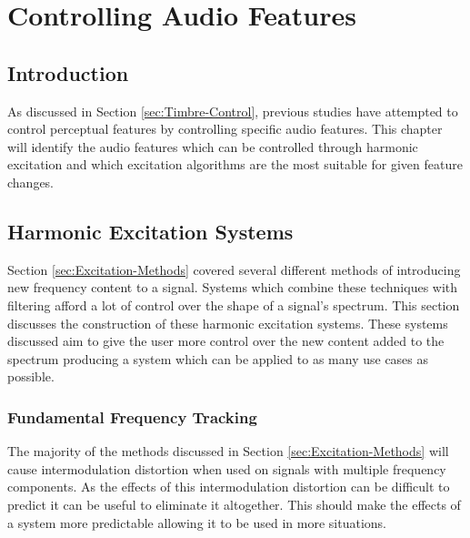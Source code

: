 
\chapter{Controlling Audio Features} %
\label{chap:FeatureControl}

\section{Introduction}
\label{sec:FeatureControl-Introduction}
	As discussed in Section \ref{sec:Timbre-Control}, previous studies have attempted to control perceptual features by
	controlling specific audio features. This chapter will identify the audio features which can be controlled through
	harmonic excitation and which excitation algorithms are the most suitable for given feature changes. 

\section{Harmonic Excitation Systems}
\label{sec:FeatureControl-Systems}
	Section \ref{sec:Excitation-Methods} covered several different methods of introducing new frequency content to a
	signal. Systems which combine these techniques with filtering afford a lot of control over the shape of a signal's
	spectrum. This section discusses the construction of these harmonic excitation systems. These systems discussed aim
	to give the user more control over the new content added to the spectrum producing a system which can be applied to
	as many use cases as possible.

	\subsection{Fundamental Frequency Tracking}
	\label{sec:FeatureControl-Systems-Fundamental}
		The majority of the methods discussed in Section \ref{sec:Excitation-Methods} will cause intermodulation
		distortion when used on signals with multiple frequency components. As the effects of this intermodulation
		distortion can be difficult to predict it can be useful to eliminate it altogether. This should make the
		effects of a system more predictable allowing it to be used in more situations.

